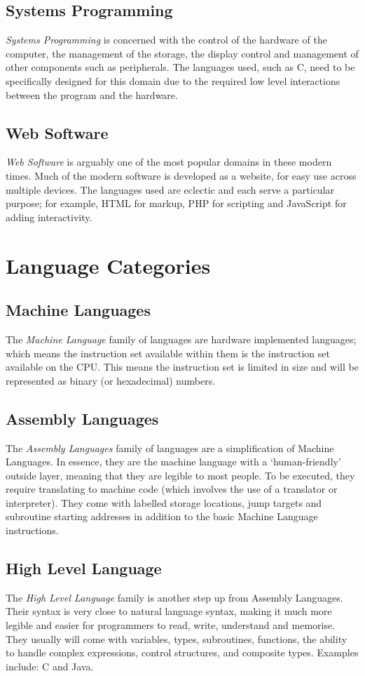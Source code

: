 \subsection{Systems Programming}
\textit{Systems Programming} is concerned with the control of the hardware of the computer, the management of the storage, the display control and management of other components such as peripherals. The languages used, such as C, need to be specifically designed for this domain due to the required low level interactions between the program and the hardware.

\subsection{Web Software}
\textit{Web Software} is arguably one of the most popular domains in these modern times. Much of the modern software is developed as a website, for easy use across multiple devices. The languages used are eclectic and each serve a particular purpose; for example, HTML for markup, PHP for scripting and JavaScript for adding interactivity.

\section{Language Categories}
\subsection{Machine Languages}
The \textit{Machine Language} family of languages are hardware implemented languages; which means the instruction set available within them is the instruction set available on the CPU. This means the instruction set is limited in size and will be represented as binary (or hexadecimal) numbers.
\subsection{Assembly Languages}
The \textit{Assembly Languages} family of languages are a simplification of Machine Languages. In essence, they are the machine language with a `human-friendly' outside layer, meaning that they are legible to most people. To be executed, they require translating to machine code (which involves the use of a translator or interpreter). They come with labelled storage locations, jump targets and subroutine starting addresses in addition to the basic Machine Language instructions.
\subsection{High Level Language}
The \textit{High Level Language} family is another step up from Assembly Languages. Their syntax is very close to natural language syntax, making it much more legible and easier for programmers to read, write, understand and memorise. They usually will come with variables, types, subroutines, functions, the ability to handle complex expressions, control structures, and composite types. Examples include: C and Java.

